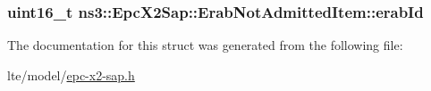 \subsubsection[{\texorpdfstring{erab\+Id}{erabId}}]{\setlength{\rightskip}{0pt plus 5cm}uint16\+\_\+t ns3\+::\+Epc\+X2\+Sap\+::\+Erab\+Not\+Admitted\+Item\+::erab\+Id}\hypertarget{structns3_1_1EpcX2Sap_1_1ErabNotAdmittedItem_afebdd8007d65b39398445a4c4367e91f}{}\label{structns3_1_1EpcX2Sap_1_1ErabNotAdmittedItem_afebdd8007d65b39398445a4c4367e91f}


The documentation for this struct was generated from the following file\+:\begin{DoxyCompactItemize}
\item 
lte/model/\hyperlink{epc-x2-sap_8h}{epc-\/x2-\/sap.\+h}\end{DoxyCompactItemize}
